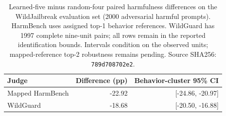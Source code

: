 \begin{table}[t]
\centering\small
\begin{tabular}{lrr}
\toprule
Judge & Difference (pp) & Behavior-cluster 95\% CI \\
\midrule
Mapped HarmBench & -22.92 & [-24.86, -20.97] \\
WildGuard & -18.68 & [-20.50, -16.88] \\
\bottomrule
\end{tabular}
\caption{Learned-five minus random-four paired harmfulness differences on the WildJailbreak evaluation set (2000 adversarial harmful prompts). HarmBench uses assigned top-1 behavior references. WildGuard has 1997 complete nine-unit pairs; all rows remain in the reported identification bounds. Intervals condition on the observed units; mapped-reference top-2 robustness remains pending. Source SHA256: \texttt{789d708702e2}.}
\label{tab:wjb-official-nine}
\end{table}
